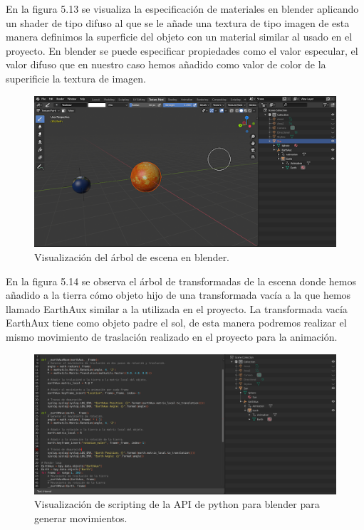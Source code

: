\documentclass[a4paper, 17pt]{book}
\begin{document}
En la figura 5.13 se visualiza la especificación de materiales en blender aplicando un shader de tipo difuso al que se le añade una
textura de tipo imagen de esta manera definimos la superficie del objeto con un material similar al usado en el proyecto. En blender
se puede especificar propiedades como el valor especular, el valor difuso que en nuestro caso hemos añadido como valor de color
de la superificie la textura de imagen.
\pagebreak

\begin{figure}[hbt!]
    \centering
    \includegraphics[scale=0.45, keepaspectratio]{img/SceneSolar.png}
    \caption{Visualización del árbol de escena en blender.}
    \label{figura:materialesBlender}
\end{figure}

En la figura 5.14 se observa el árbol de transformadas de la escena donde hemos añadido a la tierra cómo objeto hijo de una transformada
vacía a la que hemos llamado EarthAux similar a la utilizada en el proyecto. La transformada vacía EarthAux tiene como objeto padre el
sol, de esta manera podremos realizar el mismo movimiento de traslación realizado en el proyecto para la animación. 

\begin{figure}[hbt!]
    \centering
    \includegraphics[scale=0.20, keepaspectratio]{img/Scripting.png}
    \caption{Visualización de scripting de la API de python para blender para generar movimientos.}
    \label{figura:materialesBlender}
\end{figure}
\end{document}
